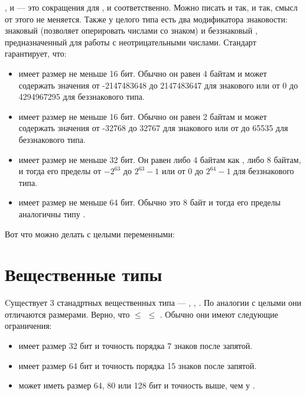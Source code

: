 \documentclass[book.tex]{subfiles}
\begin{document}

,  и  --- это сокращения для ,  и  соответственно. Можно писать и так, и так, смысл от этого не меняется. Также у целого типа есть два модификатора знаковости: знаковый  (позволяет оперировать числами со знаком) и беззнаковый , предназначенный для работы с неотрицательными числами. Стандарт гарантирует, что:

\begin{itemize}
\item {} имеет размер не меньше 16 бит. Обычно он равен 4 байтам и может содержать значения от -2147483648 до 2147483647 для знакового или от 0 до 4294967295 для беззнакового типа.
\item {} имеет размер не меньше 16 бит. Обычно он равен 2 байтам и может содержать значения от -32768 до 32767 для знакового или от до 65535 для беззнакового типа.
\item {} имеет размер не меньше 32 бит. Он равен либо 4 байтам как , либо 8 байтам, и тогда его пределы от $-2^{63}$ до $2^{63} - 1$ или от 0 до $2^{64} - 1$ для беззнакового типа.
\item {} имеет размер не меньше 64 бит. Обычно это 8 байт и тогда его пределы аналогичны типу .
\end{itemize}


Вот что можно делать с целыми переменными:


\section*{Вещественные типы}

Cуществует 3 станадртных вещественных типа --- , , . По аналогии с целыми они отличаются размерами. Верно, что  $\leq$  $\leq$ . Обычно они имеют следующие ограничения:

\begin{itemize}
\item {} имеет размер 32 бит и точность порядка 7 знаков после запятой.
\item {} имеет размер 64 бит и точность порядка 15 знаков после запятой.
\item {} может иметь размер 64, 80 или 128 бит и точность выше, чем у .
\end{itemize}
\end{document}
